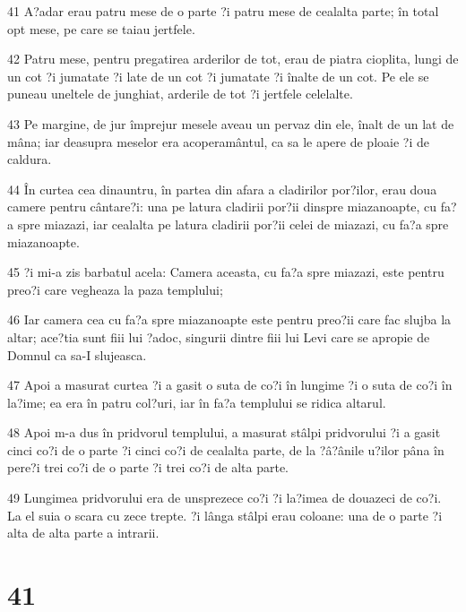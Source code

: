 \par 41 A?adar erau patru mese de o parte ?i patru mese de cealalta parte; în total opt mese, pe care se taiau jertfele.
\par 42 Patru mese, pentru pregatirea arderilor de tot, erau de piatra cioplita, lungi de un cot ?i jumatate ?i late de un cot ?i jumatate ?i înalte de un cot. Pe ele se puneau uneltele de junghiat, arderile de tot ?i jertfele celelalte.
\par 43 Pe margine, de jur împrejur mesele aveau un pervaz din ele, înalt de un lat de mâna; iar deasupra meselor era acoperamântul, ca sa le apere de ploaie ?i de caldura.
\par 44 În curtea cea dinauntru, în partea din afara a cladirilor por?ilor, erau doua camere pentru cântare?i: una pe latura cladirii por?ii dinspre miazanoapte, cu fa?a spre miazazi, iar cealalta pe latura cladirii por?ii celei de miazazi, cu fa?a spre miazanoapte.
\par 45 ?i mi-a zis barbatul acela: Camera aceasta, cu fa?a spre miazazi, este pentru preo?i care vegheaza la paza templului;
\par 46 Iar camera cea cu fa?a spre miazanoapte este pentru preo?ii care fac slujba la altar; ace?tia sunt fiii lui ?adoc, singurii dintre fiii lui Levi care se apropie de Domnul ca sa-I slujeasca.
\par 47 Apoi a masurat curtea ?i a gasit o suta de co?i în lungime ?i o suta de co?i în la?ime; ea era în patru col?uri, iar în fa?a templului se ridica altarul.
\par 48 Apoi m-a dus în pridvorul templului, a masurat stâlpi pridvorului ?i a gasit cinci co?i de o parte ?i cinci co?i de cealalta parte, de la ?â?ânile u?ilor pâna în pere?i trei co?i de o parte ?i trei co?i de alta parte.
\par 49 Lungimea pridvorului era de unsprezece co?i ?i la?imea de douazeci de co?i. La el suia o scara cu zece trepte. ?i lânga stâlpi erau coloane: una de o parte ?i alta de alta parte a intrarii.

\chapter{41}

